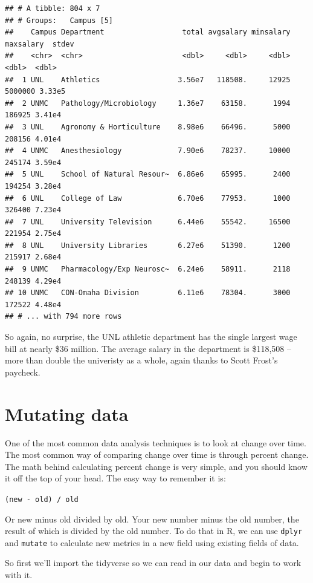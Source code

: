 \documentclass[]{book}
\begin{document}
\begin{verbatim}
## # A tibble: 804 x 7
## # Groups:   Campus [5]
##    Campus Department                  total avgsalary minsalary maxsalary  stdev
##    <chr>  <chr>                       <dbl>     <dbl>     <dbl>     <dbl>  <dbl>
##  1 UNL    Athletics                  3.56e7   118508.     12925   5000000 3.33e5
##  2 UNMC   Pathology/Microbiology     1.36e7    63158.      1994    186925 3.41e4
##  3 UNL    Agronomy & Horticulture    8.98e6    66496.      5000    208156 4.01e4
##  4 UNMC   Anesthesiology             7.90e6    78237.     10000    245174 3.59e4
##  5 UNL    School of Natural Resour~  6.86e6    65995.      2400    194254 3.28e4
##  6 UNL    College of Law             6.70e6    77953.      1000    326400 7.23e4
##  7 UNL    University Television      6.44e6    55542.     16500    221954 2.75e4
##  8 UNL    University Libraries       6.27e6    51390.      1200    215917 2.68e4
##  9 UNMC   Pharmacology/Exp Neurosc~  6.24e6    58911.      2118    248139 4.29e4
## 10 UNMC   CON-Omaha Division         6.11e6    78304.      3000    172522 4.48e4
## # ... with 794 more rows
\end{verbatim}

So again, no surprise, the UNL athletic department has the single largest wage bill at nearly \$36 million. The average salary in the department is \$118,508 -- more than double the univeristy as a whole, again thanks to Scott Frost's paycheck.

\hypertarget{mutating-data}{%
\chapter{Mutating data}\label{mutating-data}}

One of the most common data analysis techniques is to look at change over time. The most common way of comparing change over time is through percent change. The math behind calculating percent change is very simple, and you should know it off the top of your head. The easy way to remember it is:

\texttt{(new\ -\ old)\ /\ old}

Or new minus old divided by old. Your new number minus the old number, the result of which is divided by the old number. To do that in R, we can use \texttt{dplyr} and \texttt{mutate} to calculate new metrics in a new field using existing fields of data.

So first we'll import the tidyverse so we can read in our data and begin to work with it.
\end{document}
